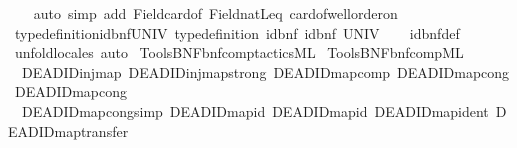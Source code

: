 \begin{isabellebody}
\ \ \isamarkupfalse%
\ {\isacharparenleft}{\kern0pt}auto\ simp\ add{\isacharcolon}{\kern0pt}\ Field{\isacharunderscore}{\kern0pt}card{\isacharunderscore}{\kern0pt}of\ Field{\isacharunderscore}{\kern0pt}natLeq\ card{\isacharunderscore}{\kern0pt}of{\isacharunderscore}{\kern0pt}well{\isacharunderscore}{\kern0pt}order{\isacharunderscore}{\kern0pt}on{\isacharparenright}{\kern0pt}{\isacharbrackleft}{\kern0pt}{}{\isacharbrackright}{\kern0pt}\isanewline
\ \ \isamarkupfalse%
%
\endisatagproof
{\isafoldproof}%
%
\isadelimproof
\isanewline
%
\endisadelimproof
\isanewline
{}\isamarkupfalse%
\ type{\isacharunderscore}{\kern0pt}definition{\isacharunderscore}{\kern0pt}id{\isacharunderscore}{\kern0pt}bnf{\isacharunderscore}{\kern0pt}UNIV{\isacharcolon}{\kern0pt}\ {\isachardoublequoteopen}type{\isacharunderscore}{\kern0pt}definition\ id{\isacharunderscore}{\kern0pt}bnf\ id{\isacharunderscore}{\kern0pt}bnf\ UNIV{\isachardoublequoteclose}\isanewline
%
\isadelimproof
\ \ %
\endisadelimproof
%
\isatagproof
{}\isamarkupfalse%
\ id{\isacharunderscore}{\kern0pt}bnf{\isacharunderscore}{\kern0pt}def\ \isamarkupfalse%
\ unfold{\isacharunderscore}{\kern0pt}locales\ auto%
\endisatagproof
{\isafoldproof}%
%
\isadelimproof
\isanewline
%
\endisadelimproof
%
\isadelimML
\isanewline
%
\endisadelimML
%
\isatagML
{}\isamarkupfalse%
\ {\isacartoucheopen}Tools{\isacharslash}{\kern0pt}BNF{\isacharslash}{\kern0pt}bnf{\isacharunderscore}{\kern0pt}comp{\isacharunderscore}{\kern0pt}tactics{\isachardot}{\kern0pt}ML{\isacartoucheclose}\isanewline
{}\isamarkupfalse%
\ {\isacartoucheopen}Tools{\isacharslash}{\kern0pt}BNF{\isacharslash}{\kern0pt}bnf{\isacharunderscore}{\kern0pt}comp{\isachardot}{\kern0pt}ML{\isacartoucheclose}%
\endisatagML
{\isafoldML}%
%
\isadelimML
\isanewline
%
\endisadelimML
\isanewline
{}\isamarkupfalse%
\isanewline
\ \ DEADID{\isachardot}{\kern0pt}inj{\isacharunderscore}{\kern0pt}map\ DEADID{\isachardot}{\kern0pt}inj{\isacharunderscore}{\kern0pt}map{\isacharunderscore}{\kern0pt}strong\ DEADID{\isachardot}{\kern0pt}map{\isacharunderscore}{\kern0pt}comp\ DEADID{\isachardot}{\kern0pt}map{\isacharunderscore}{\kern0pt}cong\ DEADID{\isachardot}{\kern0pt}map{\isacharunderscore}{\kern0pt}cong{}\isanewline
\ \ DEADID{\isachardot}{\kern0pt}map{\isacharunderscore}{\kern0pt}cong{\isacharunderscore}{\kern0pt}simp\ DEADID{\isachardot}{\kern0pt}map{\isacharunderscore}{\kern0pt}id\ DEADID{\isachardot}{\kern0pt}map{\isacharunderscore}{\kern0pt}id{}\ DEADID{\isachardot}{\kern0pt}map{\isacharunderscore}{\kern0pt}ident\ DEADID{\isachardot}{\kern0pt}map{\isacharunderscore}{\kern0pt}transfer\isanewline

\end{isabellebody}
